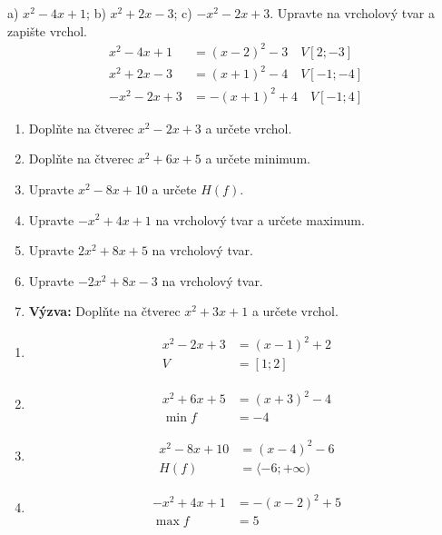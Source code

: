 \documentclass[11pt,a4paper]{article}
\begin{document}
\begin{zadaniReseniBox}[title={Samostatná práce 1}]
a) $x^2-4x+1$; b) $x^2+2x-3$; c) $-x^2-2x+3$. Upravte na vrcholový tvar a zapište vrchol.
\tcblower
\[
\begin{aligned}
x^2-4x+1&=(x-2)^2-3\quad V[2;-3] \\
x^2+2x-3&=(x+1)^2-4\quad V[-1;-4] \\
-x^2-2x+3&=-(x+1)^2+4\quad V[-1;4]
\end{aligned}
\]

\end{zadaniReseniBox}
\begin{zadaniReseniBox}[title={Domácí úkol}]
\begin{enumerate}[label=\alph*),itemsep=3pt]
\item Doplňte na čtverec $x^2-2x+3$ a určete vrchol.
\item Doplňte na čtverec $x^2+6x+5$ a určete minimum.
\item Upravte $x^2-8x+10$ a určete $H(f)$.
\item Upravte $-x^2+4x+1$ na vrcholový tvar a určete maximum.
\item Upravte $2x^2+8x+5$ na vrcholový tvar.
\item Upravte $-2x^2+8x-3$ na vrcholový tvar.
\item \textbf{Výzva:} Doplňte na čtverec $x^2+3x+1$ a určete vrchol.
\end{enumerate}
\tcblower
\begin{enumerate}[label=\alph*),itemsep=4pt]
\item
\[
\begin{aligned}
x^2-2x+3&=(x-1)^2+2 \\
V&=[1;2]
\end{aligned}
\]

\item
\[
\begin{aligned}
x^2+6x+5&=(x+3)^2-4 \\
\min f&=-4
\end{aligned}
\]

\item
\[
\begin{aligned}
x^2-8x+10&=(x-4)^2-6 \\
H(f)&=\langle-6;+\infty)
\end{aligned}
\]

\item
\[
\begin{aligned}
-x^2+4x+1&=-(x-2)^2+5 \\
\max f&=5
\end{aligned}
\]


\end{enumerate}
\end{zadaniReseniBox}
\end{document}
